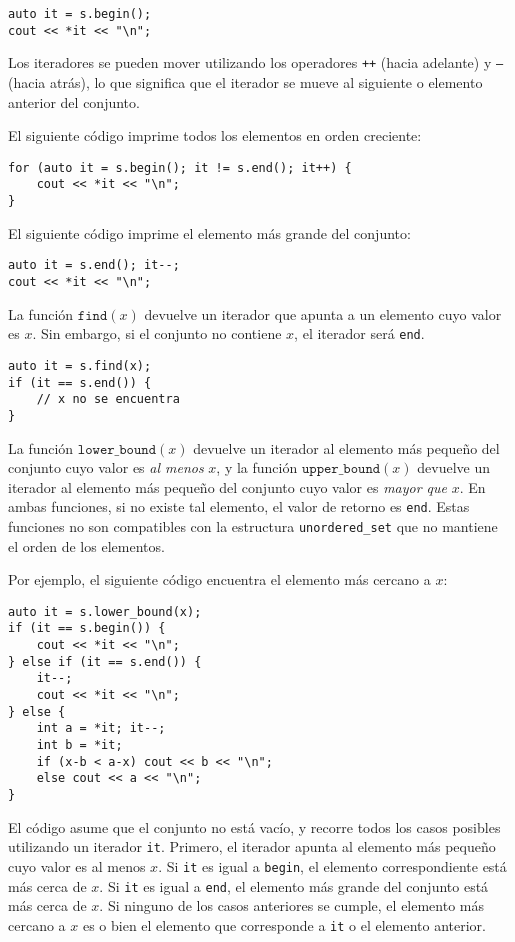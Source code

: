 \begin{lstlisting}
auto it = s.begin();
cout << *it << "\n";
\end{lstlisting}

Los iteradores se pueden mover utilizando los operadores
\texttt{++} (hacia adelante) y \texttt{--} (hacia atrás),
lo que significa que el iterador se mueve al siguiente
o elemento anterior del conjunto.

El siguiente código imprime todos los elementos
en orden creciente:
\begin{lstlisting}
for (auto it = s.begin(); it != s.end(); it++) {
    cout << *it << "\n";
}
\end{lstlisting}
El siguiente código imprime el elemento más grande del conjunto:
\begin{lstlisting}
auto it = s.end(); it--;
cout << *it << "\n";
\end{lstlisting}

La función $\texttt{find}(x)$ devuelve un iterador
que apunta a un elemento cuyo valor es $x$.
Sin embargo, si el conjunto no contiene $x$,
el iterador será \texttt{end}.

\begin{lstlisting}
auto it = s.find(x);
if (it == s.end()) {
    // x no se encuentra
}
\end{lstlisting}

La función $\texttt{lower\_bound}(x)$ devuelve
un iterador al elemento más pequeño del conjunto
cuyo valor es \emph{al menos} $x$, y
la función $\texttt{upper\_bound}(x)$
devuelve un iterador al elemento más pequeño del conjunto
cuyo valor es \emph{mayor que} $x$.
En ambas funciones, si no existe tal elemento,
el valor de retorno es \texttt{end}.
Estas funciones no son compatibles con
la estructura \texttt{unordered\_set} que
no mantiene el orden de los elementos.

\begin{samepage}
Por ejemplo, el siguiente código encuentra el elemento
más cercano a $x$:

\begin{lstlisting}
auto it = s.lower_bound(x);
if (it == s.begin()) {
    cout << *it << "\n";
} else if (it == s.end()) {
    it--;
    cout << *it << "\n";
} else {
    int a = *it; it--;
    int b = *it;
    if (x-b < a-x) cout << b << "\n";
    else cout << a << "\n";
}
\end{lstlisting}

El código asume que el conjunto no está vacío,
y recorre todos los casos posibles
utilizando un iterador \texttt{it}.
Primero, el iterador apunta al elemento más pequeño
cuyo valor es al menos $x$.
Si \texttt{it} es igual a \texttt{begin},
el elemento correspondiente está más cerca de $x$.
Si \texttt{it} es igual a \texttt{end},
el elemento más grande del conjunto está más cerca de $x$.
Si ninguno de los casos anteriores se cumple,
el elemento más cercano a $x$ es o bien el
elemento que corresponde a \texttt{it} o el elemento anterior.
\end{samepage}

